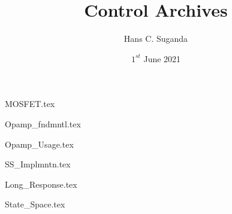 \documentclass[a4paper, 12pt]{report}
\begin{document}
\title{Control Archives}
\author{Hans C. Suganda}
\date{$1^{st}$ June 2021}
\maketitle
\newpage

\tableofcontents

\begin{center}
{MOSFET.tex}
\begin{comment}
Start Level: Chapter
End Level: Chapter
Aditional Comments:
\end{comment}
{Opamp_fndmntl.tex}
\begin{comment}
Start Level: Chapter
End Level: Chapter
Aditional Comments:
\end{comment}
{Opamp_Usage.tex}
\begin{comment}
Start Level: Chapter
End Level: Chapter
Aditional Comments:
\end{comment}
{SS_Implmntn.tex}
\begin{comment}
Start Level: Chapter
End Level: Chapter
Aditional Comments:
\end{comment}
{Long_Response.tex}
\begin{comment}
Start Level: Chapter
End Level: Chapter
Aditional Comments:
\end{comment}
{State_Space.tex}
\begin{comment}
Start Level: Chapter
End Level: Chapter
Aditional Comments:
\end{comment}
\end{center}
\end{document}

